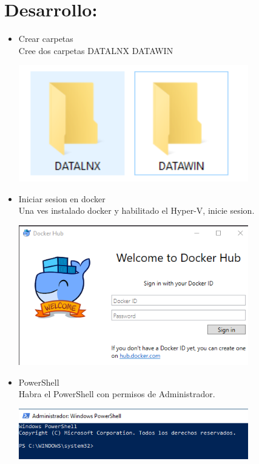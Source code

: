 \section{Desarrollo:} 

\begin{itemize}
	\item Crear carpetas
	\\Cree dos carpetas DATALNX DATAWIN

	\begin{center}
	\includegraphics[width=10cm]{./Imagenes/1} 
	\end{center}

\end{itemize} 

\begin{itemize}
	\item Iniciar sesion en docker
	\\Una ves instalado docker y habilitado el Hyper-V, inicie sesion.

	\begin{center}
	\includegraphics[width=10cm]{./Imagenes/2} 
	\end{center}

\end{itemize} 

\begin{itemize}
	\item PowerShell
	\\Habra el PowerShell con permisos de Administrador.

	\begin{center}
	\includegraphics[width=10cm]{./Imagenes/3} 
	\end{center}

\end{itemize} 

